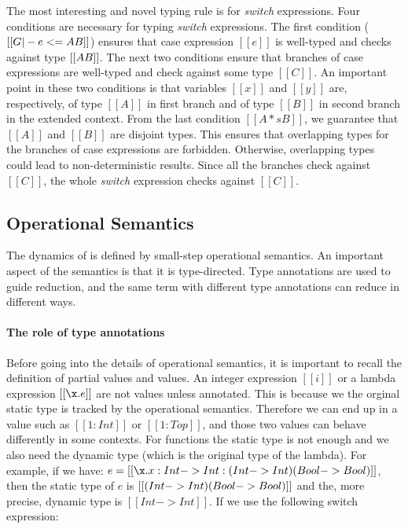 The most interesting and novel typing rule is for
\emph{switch} expressions. Four conditions are necessary for typing
\emph{switch} expressions.
The first condition ($[[G |-
    e <= A \/ B]]$) ensures that case expression $[[e]]$ is well-typed
and checks against type $[[A \/ B]]$. The next two conditions ensure that
branches of case expressions are well-typed and check against some type
$[[C]]$. An important point in these two conditions is that variables
$[[x]]$ and $[[y]]$ are, respectively, of type $[[A]]$ in first branch and of type $[[B]]$ in
second branch in the extended context. From the last condition
$[[A *s B]]$, we guarantee that $[[A]]$ and $[[B]]$ are disjoint
types. This ensures that overlapping types for the branches of case expressions
are forbidden. Otherwise, overlapping types could lead to
non-deterministic results.
Since all the branches check against $[[C]]$, the whole
\emph{switch} expression checks against $[[C]]$.

\begin{comment}
\begin{figure}[t]
  \begin{small}
    \centering
    \drules[typ]{$ [[G |- e dirflag A]] $}{Bidirectional Typing}{int, var, ann, app, sub, abs, typeof}
  \end{small}
  \caption{Typing for \cal.}
  \label{fig:union:typ}
\end{figure}
\end{comment}

\subsection{Operational Semantics}
\label{sec:union:os}
The dynamics of \cal is defined by small-step operational semantics.
An important aspect of the semantics is that it is type-directed.
Type annotations are used to guide reduction, and the same term
with different type annotations can reduce in different ways.

\paragraph{The role of type annotations}
Before going
into the details of operational semantics, it is important to recall
the definition of partial values and values. An integer expression $[[i]]$ or a
lambda expression $[[\x.e]]$ are not values unless annotated. This is
because we the orginal static type is tracked by the operational semantics.
Therefore we can end up in a value such as $[[1 : Int]]$ or $[[1 : Top]]$,
and those two values can behave differently in some contexts.
For functions the static type is not enough and we also need the dynamic type
(which is the original type of the lambda).
For example, if we have:
$e = [[\x.x:Int->Int:(Int->Int)\/(Bool->Bool)]]$, then the static type of $e$ is
$[[(Int->Int)\/(Bool->Bool)]]$ and the, more precise, dynamic type is
$[[Int->Int]]$. If we use the following switch expression:

